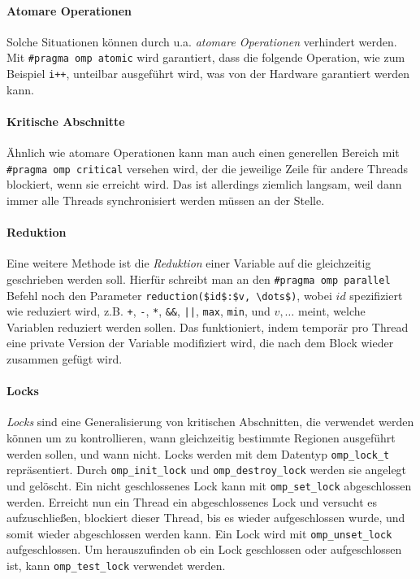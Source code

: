 \paragraph{Atomare Operationen}
Solche Situationen können durch u.a. \emph{atomare Operationen} verhindert werden.
Mit \lstinline|#pragma omp atomic| wird garantiert, dass die folgende Operation, wie zum Beispiel \lstinline|i++|, unteilbar ausgeführt wird, was von der Hardware garantiert werden kann.

\paragraph{Kritische Abschnitte}
Ähnlich wie atomare Operationen kann man auch einen generellen Bereich mit \lstinline|#pragma omp critical| versehen wird, der die jeweilige Zeile für andere Threads blockiert, wenn sie erreicht wird.
Das ist allerdings ziemlich langsam, weil dann immer alle Threads synchronisiert werden müssen an der Stelle.

\paragraph{Reduktion}
Eine weitere Methode ist die \emph{Reduktion} einer Variable auf die gleichzeitig geschrieben werden soll.
Hierfür schreibt man an den \lstinline|#pragma omp parallel| Befehl noch den Parameter \lstinline|reduction($id$:$v, \dots$)|, wobei \(id\) spezifiziert wie reduziert wird, z.B. \lstinline|+|, \lstinline|-|, \lstinline|*|, \lstinline|&&|, \lstinline&||&, \lstinline|max|, \lstinline|min|, und \(v, \dots\) meint, welche Variablen reduziert werden sollen.
Das funktioniert, indem temporär pro Thread eine private Version der Variable modifiziert wird, die nach dem Block wieder zusammen gefügt wird.

\paragraph{Locks}
\emph{Locks} sind eine Generalisierung von kritischen Abschnitten, die verwendet werden können um zu kontrollieren, wann gleichzeitig bestimmte Regionen ausgeführt werden sollen, und wann nicht.
Locks werden mit dem Datentyp \lstinline|omp_lock_t| repräsentiert.
Durch \lstinline|omp_init_lock| und \lstinline|omp_destroy_lock| werden sie angelegt und gelöscht.
Ein nicht geschlossenes Lock kann mit \lstinline|omp_set_lock| abgeschlossen werden.
Erreicht nun ein Thread ein abgeschlossenes Lock und versucht es aufzuschließen, blockiert dieser Thread, bis es wieder aufgeschlossen wurde, und somit wieder abgeschlossen werden kann.
Ein Lock wird mit \lstinline|omp_unset_lock| aufgeschlossen.
Um herauszufinden ob ein Lock geschlossen oder aufgeschlossen ist, kann \lstinline|omp_test_lock| verwendet werden.

